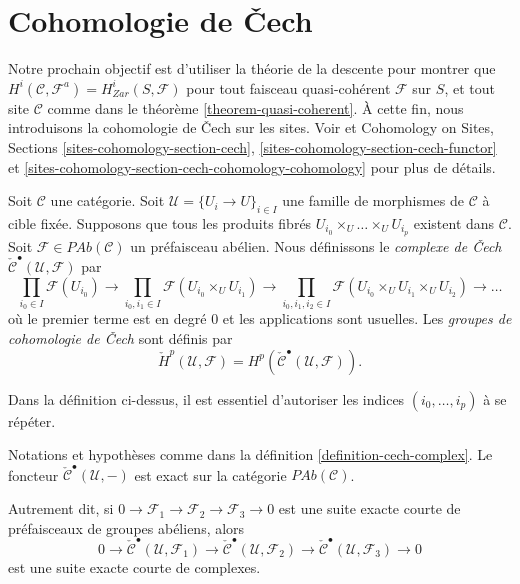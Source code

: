 \section{Cohomologie de {\v C}ech}
\label{section-cech-cohomology}

\noindent
Notre prochain objectif est d'utiliser la th\'eorie de la descente pour montrer que
$H^i(\mathcal{C}, \mathcal{F}^a) = H_{Zar}^i(S, \mathcal{F})$
pour tout faisceau quasi-coh\'erent $\mathcal{F}$ sur $S$, et
tout site $\mathcal{C}$ comme dans le th\'eor\`eme \ref{theorem-quasi-coherent}.
\`A cette fin, nous introduisons la cohomologie de {\v C}ech sur les sites.
Voir \cite{ArtinTopologies} et
Cohomology on Sites, Sections \ref{sites-cohomology-section-cech},
\ref{sites-cohomology-section-cech-functor}
et \ref{sites-cohomology-section-cech-cohomology-cohomology}
pour plus de d\'etails.

\begin{definition}
\label{definition-cech-complex}
Soit $\mathcal{C}$ une cat\'egorie. Soit
$\mathcal{U} = \{U_i \to U\}_{i \in I}$ une famille de morphismes de
$\mathcal{C}$ \`a cible fix\'ee. Supposons que tous les produits fibr\'es
$U_{i_0} \times_U \ldots \times_U U_{i_p}$ existent dans $\mathcal{C}$.
Soit $\mathcal{F} \in \textit{PAb}(\mathcal{C})$ un
pr\'efaisceau ab\'elien. Nous d\'efinissons le {\it complexe de {\v C}ech}
$\check{\mathcal{C}}^\bullet(\mathcal{U}, \mathcal{F})$ par
$$
\prod_{i_0 \in I} \mathcal{F}(U_{i_0}) \to
\prod_{i_0, i_1 \in I} \mathcal{F}(U_{i_0} \times_U U_{i_1}) \to
\prod_{i_0, i_1, i_2 \in I}
\mathcal{F}(U_{i_0} \times_U U_{i_1} \times_U U_{i_2}) \to \ldots
$$
o\`u le premier terme est en degr\'e 0 et les applications sont usuelles.
Les {\it groupes de cohomologie de {\v C}ech} sont d\'efinis par
$$
\check{H}^p(\mathcal{U}, \mathcal{F}) =
H^p(\check{\mathcal{C}}^\bullet(\mathcal{U}, \mathcal{F})).
$$
\end{definition}

\noindent
Dans la d\'efinition ci-dessus, il est essentiel d'autoriser les indices
$(i_0, \ldots, i_p)$ \`a se r\'ep\'eter.

\begin{lemma}
\label{lemma-cech-presheaves}
Notations et hypoth\`eses comme dans la d\'efinition \ref{definition-cech-complex}.
Le foncteur $\check{\mathcal{C}}^\bullet(\mathcal{U}, -)$
est exact sur la cat\'egorie $\textit{PAb}(\mathcal{C})$.
\end{lemma}

\noindent
Autrement dit, si $0\to \mathcal{F}_1\to \mathcal{F}_2\to \mathcal{F}_3\to 0$
est une suite exacte courte de pr\'efaisceaux de groupes ab\'eliens, alors
$$
0 \to \check{\mathcal{C}}^\bullet\left(\mathcal{U}, \mathcal{F}_1\right)
\to\check{\mathcal{C}}^\bullet(\mathcal{U}, \mathcal{F}_2) \to
\check{\mathcal{C}}^\bullet(\mathcal{U}, \mathcal{F}_3)\to 0
$$
est une suite exacte courte de complexes.


